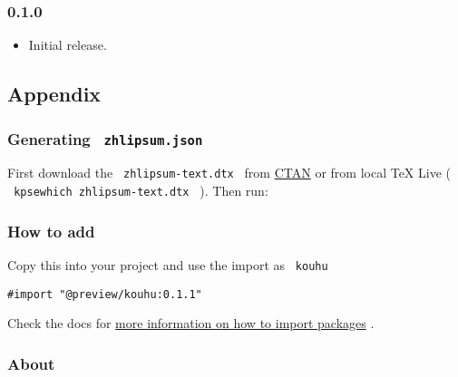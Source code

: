\subsubsection{0.1.0}\label{section-1}

\begin{itemize}
\tightlist
\item
  Initial release.
\end{itemize}

\subsection{Appendix}\label{appendix}

\subsubsection{\texorpdfstring{Generating
\texttt{\ zhlipsum.json\ }}{Generating  zhlipsum.json }}\label{generating-zhlipsum.json}

First download the \texttt{\ zhlipsum-text.dtx\ } from
\href{https://ctan.org/pkg/zhlipsum}{CTAN} or from local TeX Live (
\texttt{\ kpsewhich\ zhlipsum-text.dtx\ } ). Then run:

\begin{Shaded}
\begin{Highlighting}[]
\end{Highlighting}
\end{Shaded}

\subsubsection{How to add}\label{how-to-add}

Copy this into your project and use the import as \texttt{\ kouhu\ }

\begin{verbatim}
#import "@preview/kouhu:0.1.1"
\end{verbatim}



Check the docs for
\href{https://typst.app/docs/reference/scripting/\#packages}{more
information on how to import packages} .

\subsubsection{About}\label{about}

